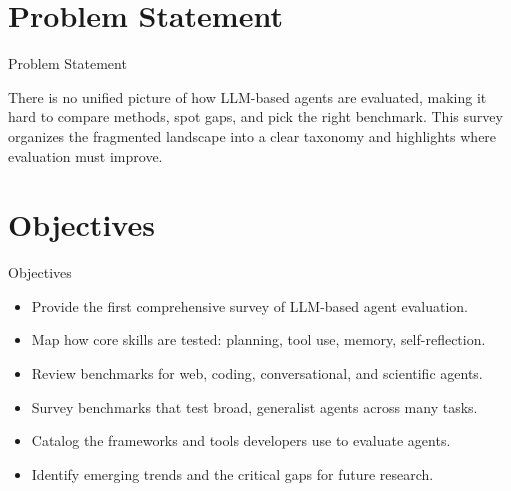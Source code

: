 \documentclass[10pt]{beamer}
\begin{document}
\section{Problem Statement}
\begin{frame}{Problem Statement}
  \begin{block}{}
  There is no unified picture of how LLM-based agents are evaluated, making it hard to compare methods, spot gaps, and pick the right benchmark. This survey organizes the fragmented landscape into a clear taxonomy and highlights where evaluation must improve.
  \end{block}
\end{frame}
\section{Objectives}
\begin{frame}{Objectives}
\begin{itemize}
  \item Provide the first comprehensive survey of LLM-based agent evaluation.
  \item Map how core skills are tested: planning, tool use, memory, self-reflection.
  \item Review benchmarks for web, coding, conversational, and scientific agents.
  \item Survey benchmarks that test broad, generalist agents across many tasks.
  \item Catalog the frameworks and tools developers use to evaluate agents.
  \item Identify emerging trends and the critical gaps for future research.
\end{itemize}
\end{frame}
\end{document}

